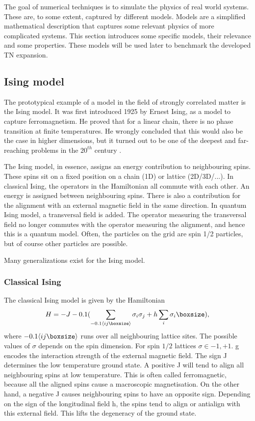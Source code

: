 The goal of numerical techniques is to simulate the physics of real world systems. These are, to some extent, captured by different models. Models are a simplified mathematical description that captures some relevant physics of more complicated systems. This section introduces some specific models, their relevance and some properties. These models will be used later to benchmark the developed \Gls{TN} expansion.

\subsection{Ising model}

The prototypical example of a model in the field of strongly correlated matter is the Ising model. It was first introduced 1925 by Ernest Ising, as a model to capture ferromagnetism. He proved that for a linear chain, there is no phase transition at finite temperatures. He wrongly concluded that this would also be the case in higher dimensions, but it turned out to be one of the deepest and far-reaching problems in the $20^{th}$ century \cite{Taroni2015}.

The Ising model, in essence, assigns an energy contribution to neighbouring spins. These spins sit on a fixed position on a chain (1D) or lattice (2D/3D/...). In classical Ising, the operators in the Hamiltonian all commute with each other. An energy is assigned between neighbouring spins. There is also a contribution for the alignment with an external magnetic field in the same direction. In quantum Ising model, a transversal field is added. The operator measuring the transversal field no longer commutes with the operator measuring the alignment, and hence this is a quantum model. Often, the particles on the grid are spin 1/2 particles, but of course other particles are possible.

Many generalizations exist for the Ising model. 

\subsubsection{Classical Ising}

The classical Ising model is given by the Hamiltonian
\begin{equation}
    H = -J \left (  \sum_{\Braket{i j }} \sigma_i \sigma_j + h \sum_i \sigma_i \right ),
\end{equation}
where $  \Braket{i j }$ runs over all neighbouring lattice sites. The possible values of $\sigma$ depends on the spin dimension. For spin $1/2$ lattices $\sigma \in {-1,+1}$. g encodes the interaction strength of the external magnetic field. The sign J determines the low temperature ground state. A positive J will tend to align all neighbouring spins at low temperature. This is often called ferromagnetic, because all the aligned spins cause a macroscopic magnetisation. On the other hand, a negative J causes neighbouring spins to have an opposite sign. Depending on the sign of the longitudinal field h, the spins tend to align or antialign with this external field. This lifts the degeneracy of the ground state.

